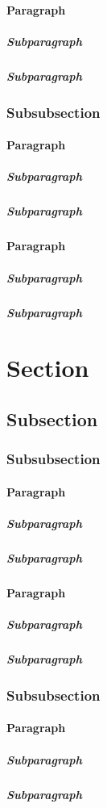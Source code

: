                 \paragraph{Paragraph}
                    \subparagraph{Subparagraph}
                    \subparagraph{Subparagraph}
            \subsubsection{Subsubsection}
                \paragraph{Paragraph}
                    \subparagraph{Subparagraph}
                    \subparagraph{Subparagraph}
                \paragraph{Paragraph}
                    \subparagraph{Subparagraph}
                    \subparagraph{Subparagraph}
    \section{Section}
        \subsection{Subsection}
            \subsubsection{Subsubsection}
                \paragraph{Paragraph}
                    \subparagraph{Subparagraph}
                    \subparagraph{Subparagraph}
                \paragraph{Paragraph}
                    \subparagraph{Subparagraph}
                    \subparagraph{Subparagraph}
            \subsubsection{Subsubsection}
                \paragraph{Paragraph}
                    \subparagraph{Subparagraph}
                    \subparagraph{Subparagraph}
